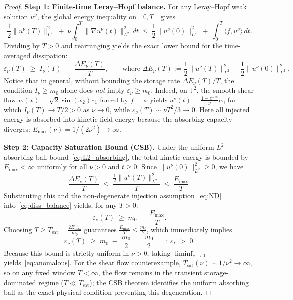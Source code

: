 \documentclass[12pt,a4paper]{article}
\theoremstyle{breakdef}
\theoremstyle{breakplain}
\theoremstyle{breakdef}
\begin{document}
\begin{proof}[Proof]
\textbf{Step 1: Finite-time Leray--Hopf balance.}\quad
For any Leray--Hopf weak solution $u^\nu$, the global energy inequality on $[0, T]$ gives
\begin{equation}\label{eq:LH_ineq}
  \frac{1}{2}\|u^\nu(T)\|_{L^2}^2 \;+\; \nu \int_0^T \|\nabla u^\nu(t)\|_{L^2}^2\,dt
  \;\le\;
  \frac{1}{2}\|u^\nu(0)\|_{L^2}^2 \;+\; \int_0^T \langle f, u^\nu \rangle\,dt.
\end{equation}
Dividing by $T > 0$ and rearranging yields the exact lower bound for the time-averaged dissipation:
\begin{equation}\label{eq:diss_balance}
  \varepsilon_\nu(T) \;\ge\; I_\nu(T) \;-\; \frac{\Delta E_\nu(T)}{T},
  \qquad \text{where } \Delta E_\nu(T) := \frac{1}{2}\|u^\nu(T)\|_{L^2}^2 - \frac{1}{2}\|u^\nu(0)\|_{L^2}^2.
\end{equation}
Notice that in general, without bounding the storage rate $\Delta E_\nu(T)/T$, the condition $I_\nu \ge m_0$ alone does \emph{not} imply $\varepsilon_\nu \ge m_0$. Indeed, on $\mathbb{T}^2$, the smooth shear flow $w(x)=\sqrt{2}\sin(x_2)e_1$ forced by $f=w$ yields $u^\nu(t) = \frac{1-e^{-\nu t}}{\nu}w$, for which $I_\nu(T) \to T/2 > 0$ as $\nu \to 0$, while $\varepsilon_\nu(T) \sim \nu T^2/3 \to 0$. Here all injected energy is absorbed into kinetic field energy because the absorbing capacity diverges: $E_{\max}(\nu) = 1/(2\nu^2) \to \infty$.

\textbf{Step 2: Capacity Saturation Bound (CSB).}\quad
Under the uniform $L^2$-absorbing ball bound~\eqref{eq:L2_absorbing}, the total kinetic energy is bounded by $E_{\max} < \infty$ uniformly for all $\nu > 0$ and $t \ge 0$. Since $\|u^\nu(0)\|_{L^2}^2 \ge 0$, we have
\begin{equation}\label{eq:storage_bound}
  \frac{\Delta E_\nu(T)}{T} \;\le\; \frac{\frac{1}{2}\|u^\nu(T)\|_{L^2}^2}{T} \;\le\; \frac{E_{\max}}{T}.
\end{equation}
Substituting this and the non-degenerate injection assumption~\eqref{eq:ND} into~\eqref{eq:diss_balance} yields, for any $T > 0$:
\begin{equation}\label{eq:CSB_step}
  \varepsilon_\nu(T) \;\ge\; m_0 \;-\; \frac{E_{\max}}{T}.
\end{equation}
Choosing $T \ge T_{\mathrm{sat}} = \frac{2 E_{\max}}{m_0}$ guarantees $\frac{E_{\max}}{T} \le \frac{m_0}{2}$, which immediately implies
\begin{equation}\label{eq:CSB_lower}
  \varepsilon_\nu(T) \;\ge\; m_0 \;-\; \frac{m_0}{2} \;=\; \frac{m_0}{2} \;=:\; \varepsilon_* \;>\; 0.
\end{equation}
Because this bound is strictly uniform in $\nu > 0$, taking $\liminf_{\nu \to 0}$ yields~\eqref{eq:anomalous}. For the shear flow counterexample, $T_{\mathrm{sat}}(\nu) \sim 1/\nu^2 \to \infty$, so on any fixed window $T < \infty$, the flow remains in the transient storage-dominated regime ($T \ll T_{\mathrm{sat}}$); the CSB theorem identifies the uniform absorbing ball as the exact physical condition preventing this degeneration.


\end{proof}
\end{document}
